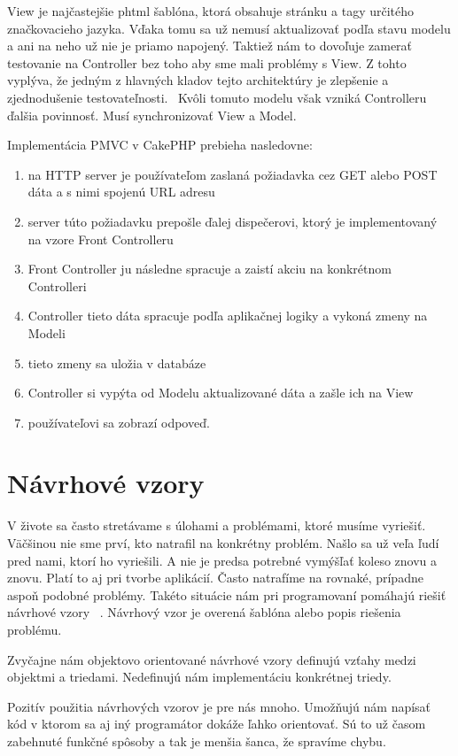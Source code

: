 \documentclass[12pt,onesided]{book}
\begin{document}
View je najčastejšie phtml šablóna, ktorá obsahuje stránku a tagy určitého značkovacieho jazyka. Vďaka tomu sa už nemusí aktualizovať podľa stavu modelu a ani na neho už nie je priamo napojený. Taktiež nám to dovoľuje zamerať testovanie na Controller bez toho aby sme mali problémy s View. Z tohto vyplýva, že jedným z hlavných kladov tejto architektúry je zlepšenie a zjednodušenie testovateľnosti. \cite{PMVC}\  Kvôli tomuto modelu však vzniká Controlleru ďalšia povinnosť. Musí synchronizovať View a Model. 
\newline

Implementácia PMVC v CakePHP prebieha nasledovne:

\begin{enumerate}
\item na HTTP server je používateľom zaslaná požiadavka cez GET alebo POST dáta a s nimi spojenú URL adresu
\item server túto požiadavku prepošle ďalej dispečerovi, ktorý je implementovaný na vzore Front Controlleru
\item Front Controller ju následne spracuje a zaistí akciu na konkrétnom Controlleri
\item Controller tieto dáta spracuje podľa aplikačnej logiky a vykoná zmeny na Modeli
\item tieto zmeny sa uložia v databáze 
\item Controller si vypýta od Modelu aktualizované dáta a zašle ich na View
\item používateľovi sa zobrazí odpoveď.
\end{enumerate}
 

\section{Návrhové vzory}
V živote sa často stretávame s úlohami a problémami, ktoré musíme vyriešiť. Väčšinou nie sme prví, kto natrafil na konkrétny problém. Našlo sa už veľa ľudí pred nami, ktorí ho vyriešili. A nie je predsa potrebné vymýšľať koleso znovu a znovu. Platí to aj pri tvorbe aplikácií.  Často natrafíme na rovnaké, prípadne aspoň podobné problémy. Takéto situácie nám pri programovaní pomáhajú riešiť návrhové vzory \cite{NavrhoveVzory}\ . Návrhový vzor je overená šablóna alebo popis riešenia problému.

Zvyčajne nám objektovo orientované návrhové vzory definujú vzťahy medzi objektmi a triedami. Nedefinujú nám implementáciu konkrétnej triedy.  

Pozitív použitia návrhových vzorov je pre nás mnoho. Umožňujú nám napísať kód v ktorom sa aj iný programátor dokáže ľahko orientovať. Sú to už časom zabehnuté funkčné spôsoby a tak je menšia šanca, že spravíme chybu. 
\end{document}
